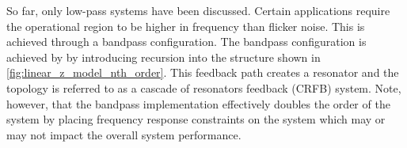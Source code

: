 So far, only low-pass systems have been discussed. Certain applications require the operational region to be higher in frequency than flicker noise. This is achieved through a bandpass configuration. The bandpass configuration is achieved by by introducing recursion into the structure shown in \ref{fig:linear_z_model_nth_order}. This feedback path creates a resonator
and the topology is referred to as a cascade of resonators feedback (CRFB) system. Note, however, that the bandpass implementation effectively doubles the order of the system by placing frequency response constraints on the system which may or may not impact the overall system performance.
